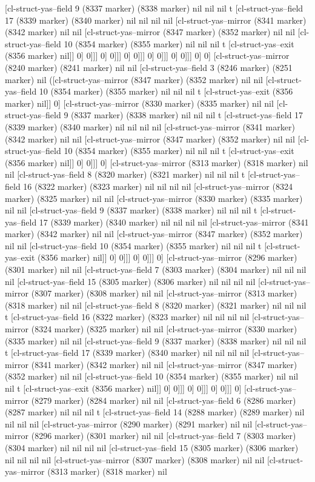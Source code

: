 {{[cl-struct-yas--field 9 (8337 marker) (8338 marker) nil nil nil t [cl-struct-yas--field 17 (8339 marker) (8340 marker) nil nil nil nil [cl-struct-yas--mirror (8341 marker) (8342 marker) nil nil [cl-struct-yas--mirror (8347 marker) (8352 marker) nil nil [cl-struct-yas--field 10 (8354 marker) (8355 marker) nil nil nil t [cl-struct-yas--exit (8356 marker) nil]] 0] 0]]] 0] 0]]] 0] 0]]] 0] 0]]] 0] 0]]] 0] 0] [cl-struct-yas--mirror (8240 marker) (8241 marker) nil nil [cl-struct-yas--field 3 (8246 marker) (8251 marker) nil ([cl-struct-yas--mirror (8347 marker) (8352 marker) nil nil [cl-struct-yas--field 10 (8354 marker) (8355 marker) nil nil nil t [cl-struct-yas--exit (8356 marker) nil]] 0] [cl-struct-yas--mirror (8330 marker) (8335 marker) nil nil [cl-struct-yas--field 9 (8337 marker) (8338 marker) nil nil nil t [cl-struct-yas--field 17 (8339 marker) (8340 marker) nil nil nil nil [cl-struct-yas--mirror (8341 marker) (8342 marker) nil nil [cl-struct-yas--mirror (8347 marker) (8352 marker) nil nil [cl-struct-yas--field 10 (8354 marker) (8355 marker) nil nil nil t [cl-struct-yas--exit (8356 marker) nil]] 0] 0]]] 0] [cl-struct-yas--mirror (8313 marker) (8318 marker) nil nil [cl-struct-yas--field 8 (8320 marker) (8321 marker) nil nil nil t [cl-struct-yas--field 16 (8322 marker) (8323 marker) nil nil nil nil [cl-struct-yas--mirror (8324 marker) (8325 marker) nil nil [cl-struct-yas--mirror (8330 marker) (8335 marker) nil nil [cl-struct-yas--field 9 (8337 marker) (8338 marker) nil nil nil t [cl-struct-yas--field 17 (8339 marker) (8340 marker) nil nil nil nil [cl-struct-yas--mirror (8341 marker) (8342 marker) nil nil [cl-struct-yas--mirror (8347 marker) (8352 marker) nil nil [cl-struct-yas--field 10 (8354 marker) (8355 marker) nil nil nil t [cl-struct-yas--exit (8356 marker) nil]] 0] 0]]] 0] 0]]] 0] [cl-struct-yas--mirror (8296 marker) (8301 marker) nil nil [cl-struct-yas--field 7 (8303 marker) (8304 marker) nil nil nil nil [cl-struct-yas--field 15 (8305 marker) (8306 marker) nil nil nil nil [cl-struct-yas--mirror (8307 marker) (8308 marker) nil nil [cl-struct-yas--mirror (8313 marker) (8318 marker) nil nil [cl-struct-yas--field 8 (8320 marker) (8321 marker) nil nil nil t [cl-struct-yas--field 16 (8322 marker) (8323 marker) nil nil nil nil [cl-struct-yas--mirror (8324 marker) (8325 marker) nil nil [cl-struct-yas--mirror (8330 marker) (8335 marker) nil nil [cl-struct-yas--field 9 (8337 marker) (8338 marker) nil nil nil t [cl-struct-yas--field 17 (8339 marker) (8340 marker) nil nil nil nil [cl-struct-yas--mirror (8341 marker) (8342 marker) nil nil [cl-struct-yas--mirror (8347 marker) (8352 marker) nil nil [cl-struct-yas--field 10 (8354 marker) (8355 marker) nil nil nil t [cl-struct-yas--exit (8356 marker) nil]] 0] 0]]] 0] 0]]] 0] 0]]] 0] [cl-struct-yas--mirror (8279 marker) (8284 marker) nil nil [cl-struct-yas--field 6 (8286 marker) (8287 marker) nil nil nil t [cl-struct-yas--field 14 (8288 marker) (8289 marker) nil nil nil nil [cl-struct-yas--mirror (8290 marker) (8291 marker) nil nil [cl-struct-yas--mirror (8296 marker) (8301 marker) nil nil [cl-struct-yas--field 7 (8303 marker) (8304 marker) nil nil nil nil [cl-struct-yas--field 15 (8305 marker) (8306 marker) nil nil nil nil [cl-struct-yas--mirror (8307 marker) (8308 marker) nil nil [cl-struct-yas--mirror (8313 marker) (8318 marker) nil }}
